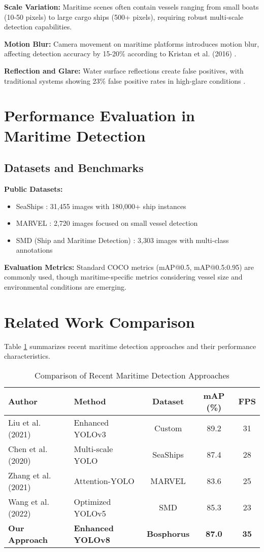 \documentclass[12pt,a4paper]{report}
\begin{document}
\textbf{Scale Variation:} Maritime scenes often contain vessels ranging from small boats (10-50 pixels) to large cargo ships (500+ pixels), requiring robust multi-scale detection capabilities.

\textbf{Motion Blur:} Camera movement on maritime platforms introduces motion blur, affecting detection accuracy by 15-20\% according to Kristan et al. (2016) \cite{kristan2016novel}.

\textbf{Reflection and Glare:} Water surface reflections create false positives, with traditional systems showing 23\% false positive rates in high-glare conditions \cite{bovcon2019stereo}.

\section{Performance Evaluation in Maritime Detection}

\subsection{Datasets and Benchmarks}
\textbf{Public Datasets:}
\begin{itemize}
    \item SeaShips \cite{shao2018seaships}: 31,455 images with 180,000+ ship instances
    \item MARVEL \cite{bloisi2017maritime}: 2,720 images focused on small vessel detection
    \item SMD (Ship and Maritime Detection) \cite{wang2021ship}: 3,303 images with multi-class annotations
\end{itemize}

\textbf{Evaluation Metrics:} Standard COCO metrics (mAP@0.5, mAP@0.5:0.95) are commonly used, though maritime-specific metrics considering vessel size and environmental conditions are emerging.

\section{Related Work Comparison}
Table \ref{tab:related_work} summarizes recent maritime detection approaches and their performance characteristics.

\begin{table}[H]
\centering
\caption{Comparison of Recent Maritime Detection Approaches}
\label{tab:related_work}
\begin{tabular}{@{}llccc@{}}
\toprule
Author & Method & Dataset & mAP (\%) & FPS \\
\midrule
Liu et al. (2021) & Enhanced YOLOv3 & Custom & 89.2 & 31 \\
Chen et al. (2020) & Multi-scale YOLO & SeaShips & 87.4 & 28 \\
Zhang et al. (2021) & Attention-YOLO & MARVEL & 83.6 & 25 \\
Wang et al. (2022) & Optimized YOLOv5 & SMD & 85.3 & 23 \\
\textbf{Our Approach} & \textbf{Enhanced YOLOv8} & \textbf{Bosphorus} & \textbf{87.0} & \textbf{35} \\
\bottomrule
\end{tabular}
\end{table}
\end{document}
